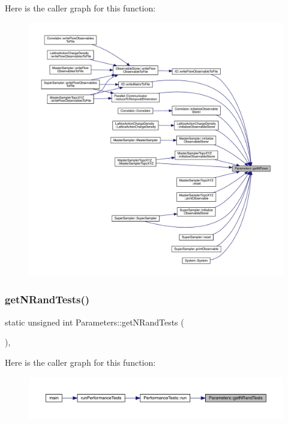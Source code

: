 Here is the caller graph for this function\+:\nopagebreak
\begin{figure}[H]
\begin{center}
\leavevmode
\includegraphics[width=350pt]{class_parameters_aae314edb18d426571ab7b6df60da70aa_icgraph}
\end{center}
\end{figure}
\mbox{\label{class_parameters_a492a81a7a0951b1165f500f8c0768fe1}} 
\subsubsection{\texorpdfstring{getNRandTests()}{getNRandTests()}}
{\footnotesize\ttfamily static unsigned int Parameters\+::get\+N\+Rand\+Tests (\begin{DoxyParamCaption}{ }\end{DoxyParamCaption})\hspace{0.3cm}{\ttfamily [inline]}, {\ttfamily [static]}}

Here is the caller graph for this function\+:\nopagebreak
\begin{figure}[H]
\begin{center}
\leavevmode
\includegraphics[width=350pt]{class_parameters_a492a81a7a0951b1165f500f8c0768fe1_icgraph}
\end{center}
\end{figure}
\mbox{\label{class_parameters_a52b90e94a378ec9fe8c504cf546e98fa}} 
